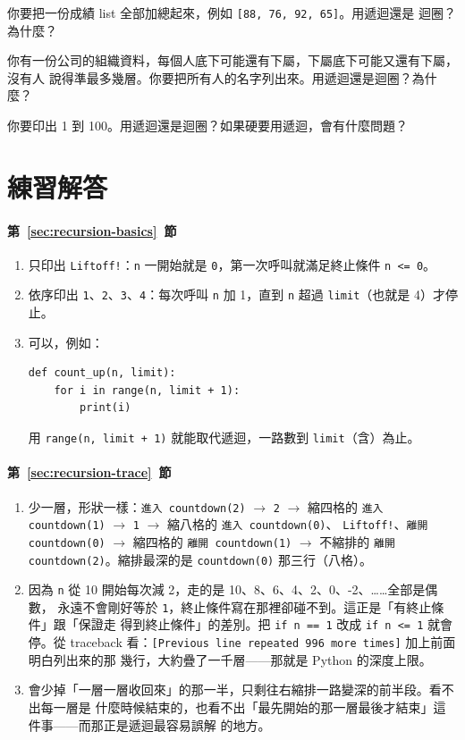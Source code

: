 \begin{drills}[label=drills:recursion-or-loop]
\item 你要把一份成績 list 全部加總起來，例如 \texttt{[88, 76, 92, 65]}。用遞迴還是
迴圈？為什麼？
\item 你有一份公司的組織資料，每個人底下可能還有下屬，下屬底下可能又還有下屬，沒有人
說得準最多幾層。你要把所有人的名字列出來。用遞迴還是迴圈？為什麼？
\item 你要印出 1 到 100。用遞迴還是迴圈？如果硬要用遞迴，會有什麼問題？
\end{drills}

\section*{練習解答}

\paragraph{第~\ref{sec:recursion-basics}~節}
\begin{enumerate}
\item 只印出 \texttt{Liftoff!}：\texttt{n} 一開始就是 \texttt{0}，第一次呼叫就滿足終止條件
\texttt{n <= 0}。
\item 依序印出 \texttt{1}、\texttt{2}、\texttt{3}、\texttt{4}：每次呼叫 \texttt{n}
加 1，直到 \texttt{n} 超過 \texttt{limit}（也就是 4）才停止。
\item 可以，例如：
\begin{verbatim}
def count_up(n, limit):
    for i in range(n, limit + 1):
        print(i)
\end{verbatim}
用 \texttt{range(n, limit + 1)} 就能取代遞迴，一路數到 \texttt{limit}（含）為止。
\end{enumerate}

\paragraph{第~\ref{sec:recursion-trace}~節}
\begin{enumerate}
\item 少一層，形狀一樣：\texttt{進入 countdown(2)} $\to$ \texttt{2} $\to$ 縮四格的
\texttt{進入 countdown(1)} $\to$ \texttt{1} $\to$ 縮八格的 \texttt{進入 countdown(0)}、
\texttt{Liftoff!}、\texttt{離開 countdown(0)} $\to$ 縮四格的 \texttt{離開 countdown(1)}
$\to$ 不縮排的 \texttt{離開 countdown(2)}。縮排最深的是
\texttt{countdown(0)} 那三行（八格）。
\item 因為 \texttt{n} 從 10 開始每次減 2，走的是 10、8、6、4、2、0、-2、……全部是偶數，
永遠不會剛好等於 \texttt{1}，終止條件寫在那裡卻碰不到。這正是「有終止條件」跟「保證走
得到終止條件」的差別。把 \texttt{if n == 1} 改成 \texttt{if n <= 1} 就會停。從
traceback 看：\texttt{[Previous line repeated 996 more times]} 加上前面明白列出來的那
幾行，大約疊了一千層——那就是 Python 的深度上限。
\item 會少掉「一層一層收回來」的那一半，只剩往右縮排一路變深的前半段。看不出每一層是
什麼時候結束的，也看不出「最先開始的那一層最後才結束」這件事——而那正是遞迴最容易誤解
的地方。
\end{enumerate}

